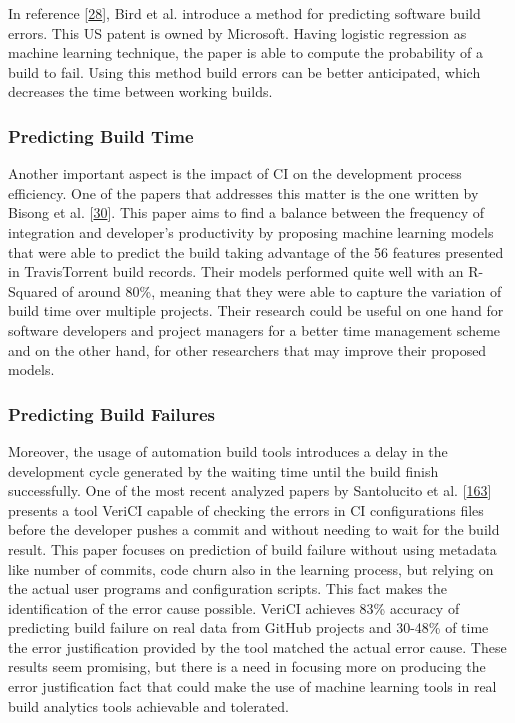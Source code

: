 \documentclass[]{book}
\begin{document}
In reference {[}\protect\hyperlink{ref-bird2017predicting}{28}{]}, Bird
et al. introduce a method for predicting software build errors. This US
patent is owned by Microsoft. Having logistic regression as machine
learning technique, the paper is able to compute the probability of a
build to fail. Using this method build errors can be better anticipated,
which decreases the time between working builds.

\subsubsection{Predicting Build Time}\label{predicting-build-time}

Another important aspect is the impact of CI on the development process
efficiency. One of the papers that addresses this matter is the one
written by Bisong et al.
{[}\protect\hyperlink{ref-bisong2017built}{30}{]}. This paper aims to
find a balance between the frequency of integration and developer's
productivity by proposing machine learning models that were able to
predict the build taking advantage of the 56 features presented in
TravisTorrent build records. Their models performed quite well with an
R-Squared of around 80\%, meaning that they were able to capture the
variation of build time over multiple projects. Their research could be
useful on one hand for software developers and project managers for a
better time management scheme and on the other hand, for other
researchers that may improve their proposed models.

\subsubsection{Predicting Build
Failures}\label{predicting-build-failures}

Moreover, the usage of automation build tools introduces a delay in the
development cycle generated by the waiting time until the build finish
successfully. One of the most recent analyzed papers by Santolucito et
al. {[}\protect\hyperlink{ref-santolucito2018statically}{163}{]}
presents a tool VeriCI capable of checking the errors in CI
configurations files before the developer pushes a commit and without
needing to wait for the build result. This paper focuses on prediction
of build failure without using metadata like number of commits, code
churn also in the learning process, but relying on the actual user
programs and configuration scripts. This fact makes the identification
of the error cause possible. VeriCI achieves 83\% accuracy of predicting
build failure on real data from GitHub projects and 30-48\% of time the
error justification provided by the tool matched the actual error cause.
These results seem promising, but there is a need in focusing more on
producing the error justification fact that could make the use of
machine learning tools in real build analytics tools achievable and
tolerated.
\end{document}
